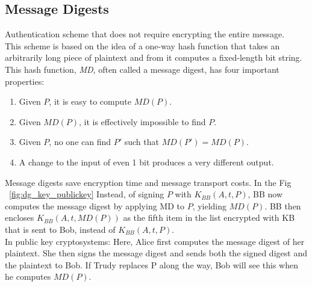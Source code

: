 \documentclass[a4paper,oneside]{book}
\begin{document}
\subsection{Message Digests}
Authentication scheme that does not require encrypting the entire message.\\
This scheme is based on the idea of a one-way hash function that takes an arbitrarily long piece of plaintext and from it computes a fixed-length bit string. \\
This hash function, \textit{MD}, often called a message digest, has four important properties:
\begin{enumerate}
\item Given $P$, it is easy to compute $MD(P)$.
\item Given $MD(P)$, it is effectively impossible to find $P$.
\item Given $P$, no one can find $P'$ such that $MD (P') = MD(P)$.
\item A change to the input of even 1 bit produces a very different output.
\end{enumerate}
Message digests save  encryption time and message transport costs.
In the Fig ~\ref{fig:dg_key_publickey}  Instead, of signing $P$ with $K_{BB} (A, t, P)$, BB now computes the message digest by applying MD to $P$, yielding $MD(P)$. BB then encloses $K_{BB} (A, t, MD(P))$ as the fifth item in the list encrypted with KB that is sent to Bob, instead of $K_{BB} (A, t, P)$.\\
In public key cryptosystems: Here, Alice first computes the message digest of her plaintext. She then signs the message digest and sends both the signed digest and the plaintext to Bob. If Trudy replaces P along the way, Bob will see this when he computes $MD(P)$.
\end{document}
